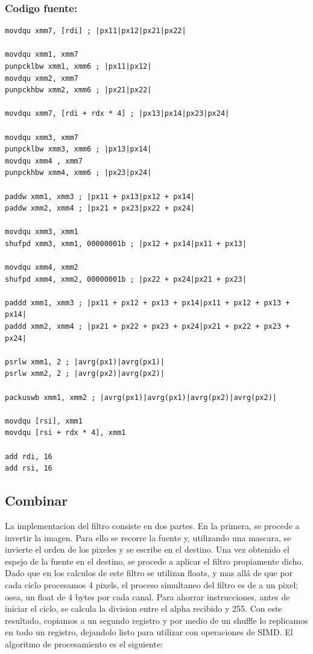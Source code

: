 \documentclass[a4paper]{article}
\newenvironment{codesnippet}{%
	\begin{Sbox}\begin{minipage}{\textwidth}\sffamily\small}%
	{\end{minipage}\end{Sbox}%
		\begin{center}%
		\vspace{-0.4cm}\colorbox{litegrey}{\TheSbox}\end{center}\vspace{0.3cm}}
\begin{document}
\subsubsection*{Codigo fuente:}
\begin{codesnippet}
\begin{internallinenumbers}
\begin{verbatim}
movdqu xmm7, [rdi] ; |px11|px12|px21|px22|

movdqu xmm1, xmm7
punpcklbw xmm1, xmm6 ; |px11|px12|
movdqu xmm2, xmm7
punpckhbw xmm2, xmm6 ; |px21|px22|

movdqu xmm7, [rdi + rdx * 4] ; |px13|px14|px23|px24|

movdqu xmm3, xmm7
punpcklbw xmm3, xmm6 ; |px13|px14|
movdqu xmm4 , xmm7
punpckhbw xmm4, xmm6 ; |px23|px24|

paddw xmm1, xmm3 ; |px11 + px13|px12 + px14|
paddw xmm2, xmm4 ; |px21 + px23|px22 + px24|

movdqu xmm3, xmm1
shufpd xmm3, xmm1, 00000001b ; |px12 + px14|px11 + px13|

movdqu xmm4, xmm2
shufpd xmm4, xmm2, 00000001b ; |px22 + px24|px21 + px23|

paddd xmm1, xmm3 ; |px11 + px12 + px13 + px14|px11 + px12 + px13 + px14|
paddd xmm2, xmm4 ; |px21 + px22 + px23 + px24|px21 + px22 + px23 + px24|

psrlw xmm1, 2 ; |avrg(px1)|avrg(px1)|
psrlw xmm2, 2 ; |avrg(px2)|avrg(px2)|

packuswb xmm1, xmm2 ; |avrg(px1)|avrg(px1)|avrg(px2)|avrg(px2)|

movdqu [rsi], xmm1
movdqu [rsi + rdx * 4], xmm1

add rdi, 16
add rsi, 16
\end{verbatim}
\end{internallinenumbers}
\end{codesnippet}
\clearpage
\subsection{Combinar}

La implementacion del filtro consiste en dos partes. En la primera, se procede a invertir la imagen. Para ello se recorre la fuente y, utilizando una mascara, se invierte el orden de los pixeles y se escribe en el destino.
Una vez obtenido el espejo de la fuente en el destino, se procede a aplicar el filtro propiamente dicho.
Dado que en los calculos de este filtro se utilizan floats, y mas allá de que por cada ciclo procesamos 4 pixels, el proceso simultaneo del filtro es de a un pixel; osea, un float de 4 bytes por cada canal.
Para ahorrar instrucciones, antes de iniciar el ciclo, se calcula la division entre el alpha recibido y 255. Con este resultado, copiamos a un segundo registro y por medio de un shuffle lo replicamos en todo un registro, dejandolo listo para utilizar con operaciones de SIMD.
El algoritmo de procesamiento es el siguiente:
\end{document}
